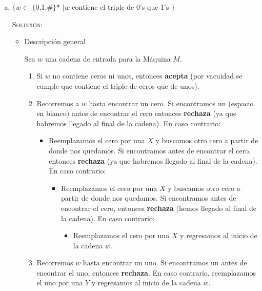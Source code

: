 \documentclass[12pt,letterpaper]{article}
\begin{document}
\begin{enumerate}[a.]
    \item $\{ w \in$ $\{$0,1,\#$\}$* $| w$ contiene el triple de 0's que 1's $\}$
    
    \textsc{Solución:}
    \begin{itemize}
        \item Descripción general
        
        Sea $w$ una cadena de entrada para la Máquina $M$.
        \begin{enumerate}[1.]
            \item Si $w$ no contiene ceros ni unos, entonces \textbf{acepta} 
            (por vacuidad se cumple que contiene el triple de ceros que de  
            unos).

            \item Recorremos a $w$ hasta encontrar un cero. Si encontramos un
            \texttt{} (espacio en blanco) antes de encontrar el cero
            entonces \textbf{rechaza} (ya que habremos llegado al final 
                de la cadena). En caso contrario:
                \begin{itemize}[2.1.]
                    \item Reemplazamos el cero por una $X$ y buscamos otro cero 
                    a partir de donde nos quedamos. Si encontramos 
                    \texttt{} antes de encontrar el 
                    cero, entonces \textbf{rechaza} (ya que habremos llegado al 
                    final de la cadena). En caso contrario:
                    \begin{itemize}[2.1.1.]
                        \item Reemplazamos el cero por una $X$ y buscamos otro 
                        cero a partir de donde nos quedamos. Si encontramos 
                        \texttt{} antes de encontrar 
                        el cero, entonces \textbf{rechaza} (hemos llegado al final de la cadena). En caso contrario:
                        \begin{itemize}[2.1.1.1]
                            \item Reemplazamos el cero por una $X$ y regresamos 
                            al inicio de la cadena $w$. 
                        \end{itemize}
                    \end{itemize}
                \end{itemize}

            \item Recorremos $w$ hasta encontrar un uno. Si encontramos un 
            \texttt{} antes de encontrar el uno, 
            entonces \textbf{rechaza}. En caso contrario, reemplazamos el uno 
            por una $Y$ y regresamos al inicio de la cadena $w$. 
            

\end{enumerate}
\end{itemize}
\end{enumerate}
\end{document}
